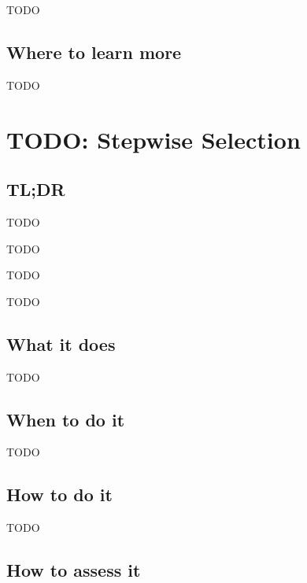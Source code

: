 \documentclass[
]{book}
\providecommand{\tightlist}{%
  \setlength{\itemsep}{0pt}\setlength{\parskip}{0pt}}
\begin{document}
TODO

\hypertarget{where-to-learn-more-10}{%
\section{Where to learn more}\label{where-to-learn-more-10}}

TODO

\hypertarget{stepwise-selection}{%
\chapter{TODO: Stepwise Selection}\label{stepwise-selection}}

\hypertarget{tldr-11}{%
\section{TL;DR}\label{tldr-11}}

\begin{description}
\tightlist
\item[What it does]
TODO
\item[When to do it]
TODO
\item[How to do it]
TODO
\item[How to assess it]
TODO
\end{description}

\hypertarget{what-it-does-11}{%
\section{What it does}\label{what-it-does-11}}

TODO

\hypertarget{when-to-do-it-11}{%
\section{When to do it}\label{when-to-do-it-11}}

TODO

\hypertarget{how-to-do-it-11}{%
\section{How to do it}\label{how-to-do-it-11}}

TODO

\hypertarget{how-to-assess-it-11}{%
\section{How to assess it}\label{how-to-assess-it-11}}
\end{document}
